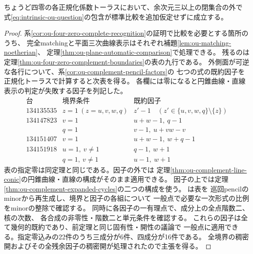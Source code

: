 \begin{corollary}[四零の比較仮定を余次元二まで除去]
\label{cor:ou-four-zero-cycle-pencils}
ちょうど四零の各正規化係数トーラスにおいて、余次元三以上の閉集合の外で
式\eqref{eq:intrinsic-ou-question}の包含が標準比較を追加仮定せずに成立する。
\end{corollary}
\begin{proof}
系\ref{cor:ou-four-zero-complete-recognition}の証明で比較を必要とする箇所のうち、
完全matchingと平面三次曲線表示はそれぞれ補題\ref{lem:ou-matching-noetherian}、
定理\ref{thm:ou-plane-automatic-comparison}で処理できる。
残るのは定理\ref{thm:ou-four-zero-complement-boundaries}の表の九行である。
外側面が可逆な各行について、系\ref{cor:ou-complement-pencil-factors}の
七つの式の既約因子を正規化トーラスで計算すると次表を得る。
各欄には零になると円錐曲線・直線表示の判定が失敗する因子を列記した。
\[
\begin{array}{c|c|l}
\text{台}&\text{境界条件}&\text{既約因子}\\\hline
134135535 & z=1\ (z=u,v,w,q)& z'-1\quad(z'\in\{u,v,w,q\}\setminus\{z\})\\
134147823 & v=1 & u+w-1,\ q-1\\
          & q=1 & v-1,\ u+vw-v\\
134151407 & v=1 & u+w-1,\ w+q-1\\
134151918 & u=1,\ v\ne1 & q-1,\ w+1\\
          & q=1,\ v\ne1 & u-1,\ w+1
\end{array}
\]
表の指定零は同定理と同じである。因子の外では
定理\ref{thm:ou-complement-line-conic}の円錐曲線・直線の構成がそのまま適用できる。
因子の上では定理\ref{thm:ou-complement-expanded-cycles}の二つの構成を使う。
は表を
巡回pencilのminorから再生成し、境界と因子の各組について
一般点で必要な一次形式の比例をminorの整除で確認する。
同時に各因子の一有理点で、成分上の全点階数二、核の次数、
各合成の非零性・階数二と単元条件を確認する。
これらの因子は全て幾何的既約であり、前定理と同じ固有性・開性の議論で
一般点に適用できる。指定零込みの22件のうち三成分が6件、四成分が16件である。
全境界の稠密開およびその全残余因子の稠密開が処理されたので主張を得る。
\end{proof}

